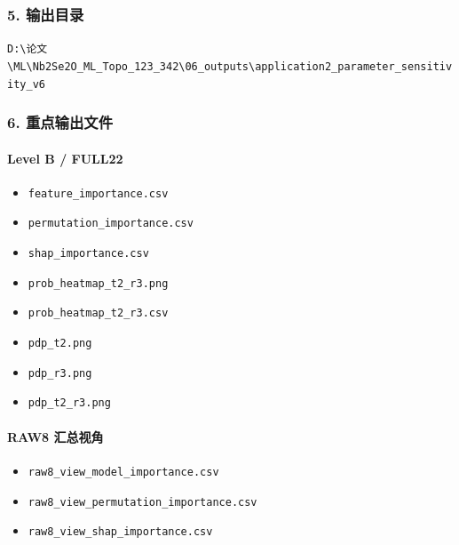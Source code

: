 \documentclass[lang=cn,scheme=chinese,color=blue,device=normal,toc=onecol,math=cm]{elegantbook}
\begin{document}
\subsubsection{5. 输出目录}


\texttt{D:\textbackslash{}\allowbreak{}论文\textbackslash{}\allowbreak{}ML\textbackslash{}\allowbreak{}Nb2Se2O\_\allowbreak{}ML\_\allowbreak{}Topo\_\allowbreak{}123\_\allowbreak{}342\textbackslash{}\allowbreak{}06\_\allowbreak{}outputs\textbackslash{}\allowbreak{}application2\_\allowbreak{}parameter\_\allowbreak{}sensitivity\_\allowbreak{}v6}\par


\subsubsection{6. 重点输出文件}


\paragraph{Level B /\allowbreak{} FULL22}


\begin{itemize}
\item \texttt{feature\_\allowbreak{}importance.csv}
\item \texttt{permutation\_\allowbreak{}importance.csv}
\item \texttt{shap\_\allowbreak{}importance.csv}
\item \texttt{prob\_\allowbreak{}heatmap\_\allowbreak{}t2\_\allowbreak{}r3.png}
\item \texttt{prob\_\allowbreak{}heatmap\_\allowbreak{}t2\_\allowbreak{}r3.csv}
\item \texttt{pdp\_\allowbreak{}t2.png}
\item \texttt{pdp\_\allowbreak{}r3.png}
\item \texttt{pdp\_\allowbreak{}t2\_\allowbreak{}r3.png}
\end{itemize}


\paragraph{RAW8 汇总视角}


\begin{itemize}
\item \texttt{raw8\_\allowbreak{}view\_\allowbreak{}model\_\allowbreak{}importance.csv}
\item \texttt{raw8\_\allowbreak{}view\_\allowbreak{}permutation\_\allowbreak{}importance.csv}
\item \texttt{raw8\_\allowbreak{}view\_\allowbreak{}shap\_\allowbreak{}importance.csv}
\end{itemize}
\end{document}
